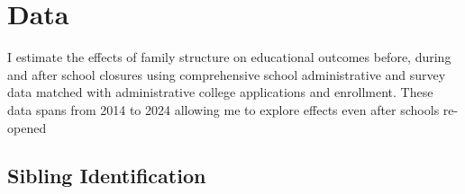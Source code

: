 \begin{comment}
\hyperref[tab:rd_summ_K_m_a_365]{Table \ref{tab:rd_summ_K_m_a_365}}

\hyperref[tab:rd_summ_2_m_a_365]{Table \ref{tab:rd_summ_2_m_a_365}}



\hyperref[tab:twfe_gpa_baseline_survey_1_pair1]{Table \ref{tab:twfe_gpa_baseline_survey_1_pair1}}


\hyperref[tab:twfe_gpa_baseline_survey_1_pair2]{Table \ref{tab:twfe_gpa_baseline_survey_1_pair2}}

\hyperref[tab:twfe_gpa_baseline_survey_1_pair3]{Table \ref{tab:twfe_gpa_baseline_survey_1_pair3}}

\hyperref[tab:twfe_gpa_baseline_survey_1_pair4]{Table \ref{tab:twfe_gpa_baseline_survey_1_pair4}}

\hyperref[tab:twfe_gpa_baseline_survey_2_pair1]{Table \ref{tab:twfe_gpa_baseline_survey_2_pair1}}

\hyperref[tab:twfe_gpa_baseline_survey_2_pair2]{Table \ref{tab:twfe_gpa_baseline_survey_2_pair2}}



\hyperref[tab:twfe_gpa_baseline_survey_2_pair3]{Table \ref{tab:twfe_gpa_baseline_survey_2_pair3}}


\hyperref[tab:twfe_gpa_baseline_survey_2_pair4]{Table \ref{tab:twfe_gpa_baseline_survey_2_pair4}}

\end{comment}

\section{Data}\label{sec:data}
I estimate the effects of family structure on educational outcomes before, during and after school closures using comprehensive school administrative and survey data matched with administrative college applications and enrollment. These data spans from 2014 to 2024 allowing me to explore effects even after schools re-opened

\subsection{Sibling Identification}

